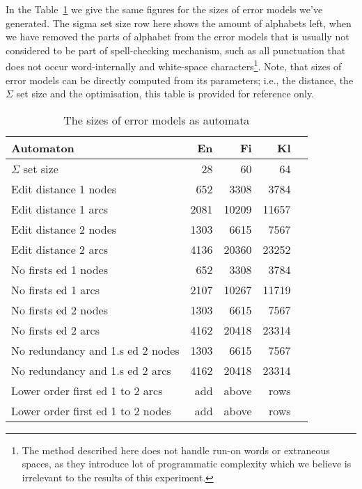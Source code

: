 \documentclass[11pt]{article}
\begin{document}
In the Table~\ref{table:error-sizes} we give the same figures for the
sizes of error models we've generated. The sigma set size row here shows the
amount of alphabets left, when we have removed the parts of alphabet from the
error models that is usually not considered to be part of spell-checking
mechanism, such as all punctuation that does not occur word-internally and
white-space characters\footnote{The method described here does not handle
run-on words or extraneous spaces, as they introduce lot of programmatic
complexity which we believe is irrelevant to the results of this experiment.}.
Note, that sizes of error models can be directly computed from its parameters;
i.e., the distance, the $\Sigma$ set size and the optimisation, this table
is provided for reference only.

\begin{table}[h]
\begin{center}
\begin{scriptsize}
\begin{tabular}{|l|rrrr|}
\hline
\bf Automaton & \bf En & \bf Fi & \bf Kl  \\ 
\hline
$\Sigma$ set size &
 28& 60& 64
\\
Edit distance 1 nodes &
 652& 3308& 3784
\\
Edit distance 1 arcs &
 2081& 10209& 11657
\\
Edit distance 2 nodes &
 1303& 6615& 7567
\\
Edit distance 2 arcs &
 4136& 20360& 23252
\\
No firsts ed 1 nodes & 
 652& 3308& 3784
\\
No firsts ed 1 arcs & 
 2107& 10267& 11719
\\
No firsts ed 2 nodes &
 1303& 6615& 7567
\\
No firsts ed 2 arcs &
 4162& 20418& 23314
\\
No redundancy and 1.s ed 2 nodes &
 1303& 6615& 7567
\\
No redundancy and 1.s ed 2 arcs &
 4162& 20418& 23314
\\
Lower order first ed 1 to 2 arcs &
add & above & rows
\\
Lower order first ed 1 to 2 nodes &
add & above & rows
\\
\hline
\end{tabular}
\end{scriptsize}
\end{center}
\caption{\label{table:error-sizes}
The sizes of error models as automata}
\end{table}
\end{document}
